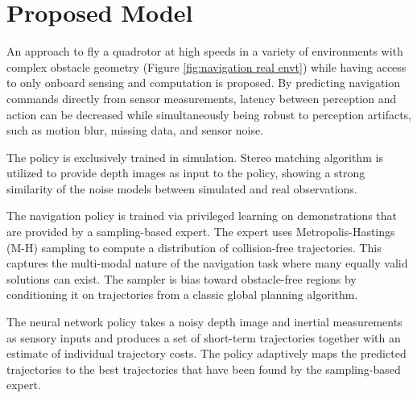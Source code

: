 \section{Proposed Model}
An approach to fly a quadrotor at high speeds in a variety of environments with complex obstacle geometry (Figure \ref{fig:navigation real envt}) while having access to only onboard sensing and computation is proposed. By predicting navigation commands directly from sensor measurements, latency between perception and action can be decreased while simultaneously being robust to perception artifacts, such as motion blur, missing data, and sensor noise. 

The policy is exclusively trained in simulation. Stereo matching algorithm \cite{stereoMatching} is utilized to provide depth images as input to the policy, showing a strong similarity of the noise models between simulated and real observations. 

The navigation policy is trained via privileged learning on demonstrations that are provided by a sampling-based expert. The expert uses Metropolis-Hastings \cite{MH_hasting} (M-H) sampling to compute a distribution of collision-free trajectories. This captures the multi-modal nature of the navigation task where many equally valid solutions can exist. The sampler is bias toward obstacle-free regions by conditioning it on trajectories from a classic global planning algorithm\cite{global_planning}.

The neural network policy takes a noisy depth image and inertial measurements as sensory inputs and produces a set of short-term trajectories together with an estimate of individual trajectory costs. The policy adaptively maps the predicted trajectories to the best trajectories that have been found by the sampling-based expert.

